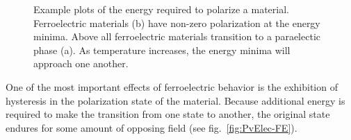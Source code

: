 \begin{figure}[tb]
   \centering
   \caption[Energy vs. Polarization Plots for FE and PE Materials]%
   		{Example plots of the energy required to polarize a material. Ferroelectric materials (b) have %
		non-zero polarization at the energy minima. Above \Tc{} all ferroelectric materials transition %
		to a paraelectic phase (a). As temperature increases, the energy minima will approach one %
		another. }
   \label{fig:EvP}
\end{figure}

One of the most important effects of ferroelectric behavior is the exhibition of hysteresis in the polarization state of the material.  Because additional energy is required to make the transition from one state to another, the original state endures for some amount of opposing field (see fig.~\vref{fig:PvElec-FE}).

